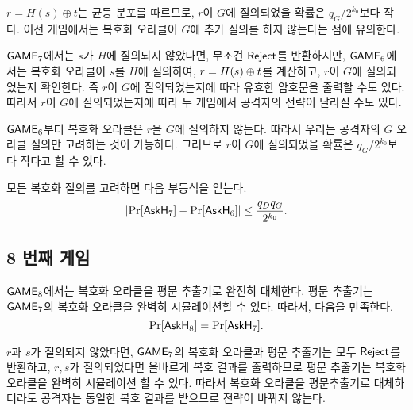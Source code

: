 $r = H(s) \oplus t$는 균등 분포를 따르므로, $r$이 $G$에 질의되었을 확률은 $q_G /
2^{k_0}$보다 작다. 이전 게임에서는 복호화 오라클이 $G$에 추가 질의를 하지 않는다는
점에 유의한다. 

\begin{memo}
	$\textsf{GAME}_7$에서는 $s$가 $H$에 질의되지 않았다면, 무조건 $\textsf{Reject}$를
	반환하지만, $\textsf{GAME}_6$에서는 복호화 오라클이 $s$를 $H$에 질의하여, $r = H(s)
	\oplus t$를 계산하고, $r$이 $G$에 질의되었는지 확인한다. 즉 $r$이 $G$에
	질의되었는지에 따라 유효한 암호문을 출력할 수도 있다. 따라서 $r$이 $G$에
	질의되었는지에 따라 두 게임에서 공격자의 전략이 달라질 수도 있다.
\end{memo}

\begin{memo}
	$\textsf{GAME}_6$부터 복호화 오라클은 $r$을 $G$에 질의하지 않는다. 따라서 우리는
	공격자의 $G$ 오라클 질의만 고려하는 것이 가능하다. 그러므로 $r$이 $G$에
	질의되었을 확률은 $q_G / 2^{k_0}$보다 작다고 할 수 있다.
\end{memo}

모든 복호화 질의를 고려하면 다음 부등식을 얻는다.
$$
	\left| \Pr[\textsf{AskH}_7] - \Pr[\textsf{AskH}_6] \right| \leq \frac{q_D q_G}{2^{k_0}}.
$$

\subsection{8 번째 게임}

$\textsf{GAME}_8$에서는 복호화 오라클을 평문 추출기로 완전히 대체한다. 평문 추출기는
$\textsf{GAME}_7$의 복호화 오라클을 완벽히 시뮬레이션할 수 있다. 따라서, 다음을 만족한다.
$$
	\Pr[\textsf{AskH}_8] = \Pr[\textsf{AskH}_7].
$$

\begin{memo}
	$r$과 $s$가 질의되지 않았다면, $\textsf{GAME}_7$의 복호화 오라클과 평문 추출기는
	모두 $\textsf{Reject}$를 반환하고, $r, s$가 질의되었다면 올바르게 복호 결과를
	출력하므로 평문 추출기는 복호화 오라클을 완벽히 시뮬레이션 할 수 있다.
	따라서 복호화 오라클을 평문추출기로 대체하더라도 공격자는 동일한 복호 결과를
	받으므로 전략이 바뀌지 않는다.
\end{memo}